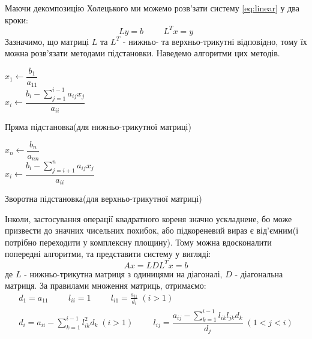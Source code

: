 \noindent
Маючи декомпозицію Холецького ми можемо розв'зати
систему \ref{eq:linear} у два кроки:
\[
    Ly = b \hspace{1cm} L^Tx = y
\]
Зазначимо, що матриці $L$ та $L^T$ - нижньо- та верхньо-трикутні відповідно,
тому їх можна розв'язати методами підстановки. Наведемо алгоритми цих методів.
\begin{algorithm}[h]
    \SetAlgoLined
    $x_1 \leftarrow \dfrac{b_1}{a_{11}} $ \\
    {
        $x_i \leftarrow \dfrac{b_i - \sum \limits_{j=1}^{i-1} a_{ij}x_j}{a_{ii}}$
    }
    \caption{Пряма підстановка(для нижньо-трикутної матриці)}
    \label{alg:forward}
\end{algorithm}

\pagebreak
\begin{algorithm}[h]
    \SetAlgoLined
    $x_n \leftarrow \dfrac{b_n}{a_{nn}} $ \\
    {
        $x_i \leftarrow \dfrac{b_i - \sum \limits_{j=i+1}^{n} a_{ij}x_{j}}{a_{ii}}$
    }
    \caption{Зворотна підстановка(для верхньо-трикутної матриці)}
    \label{alg:backward}
\end{algorithm}

\noindent
Інколи, застосування операції квадратного кореня значно ускладнене,
бо може призвести до значних чисельних похибок,
або підкореневий вираз є від'ємним(і потрібно переходити у комплексну площину).
Тому можна вдосконалити попередні алгоритми, та представити систему у вигляді:
\begin{equation}
    Ax = LDL^Tx=b
\end{equation}
де $L$ - нижньо-трикутна матриця з одиницями на діагоналі,
$D$ - діагональна матриця. За правилами множення матриць, отримаємо:
\begin{equation} \label{alg:ldl}
    \begin{gathered}
        d_{1} = a_{11} \hspace{1cm}
        l_{ii} = 1 \hspace{1cm}
        l_{i1} = \frac{a_{i1}}{d_{i}} \; (i>1) \\
        d_{i} = a_{ii} - \sum \limits_{k=1}^{i-1} l_{ik}^2 d_k \; (i>1) \hspace{1cm}
        l_{ij} = \dfrac{a_{ij} - \sum \limits_{k=1}^{i-1} l_{ik} l_{jk} d_k}{d_{j}} \; (1<j<i)
    \end{gathered}
\end{equation}
